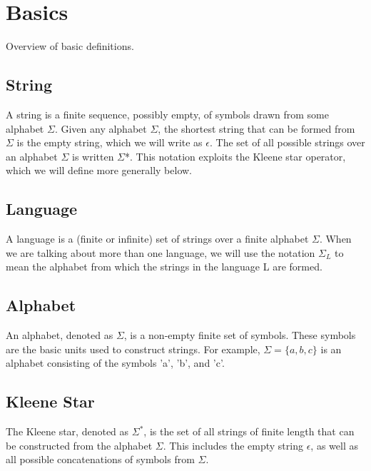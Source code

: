 \documentclass{article}
\begin{document}
% 
% 



\section{Basics}

Overview of basic definitions.

\subsection{String}

A string is a finite sequence, possibly empty, of symbols drawn from some
alphabet $\Sigma$. Given any alphabet $\Sigma$, the shortest string that can be formed from $\Sigma$
is the empty string, which we will write as $\epsilon$. The set of all possible strings
over an alphabet $\Sigma$ is written $\Sigma$*. This notation exploits the Kleene star
operator, which we will define more generally below.

\subsection{Language}

A language is a (finite or infinite) set of strings over a finite alphabet $\Sigma$.
When we are talking about more than one language, we will use the notation $\Sigma_L$
to mean the alphabet from which the strings in the language L are formed.


\subsection{Alphabet}
An alphabet, denoted as $\Sigma$, is a non-empty finite set of symbols. These
symbols are the basic units used to construct strings. For example, $\Sigma =
\{a, b, c\}$ is an alphabet consisting of the symbols 'a', 'b', and 'c'.

\subsection{Kleene Star}
The Kleene star, denoted as $\Sigma^*$, is the set of all strings of finite
length that can be constructed from the alphabet $\Sigma$. This includes the
empty string $\epsilon$, as well as all possible concatenations of symbols from
$\Sigma$.
\end{document}
